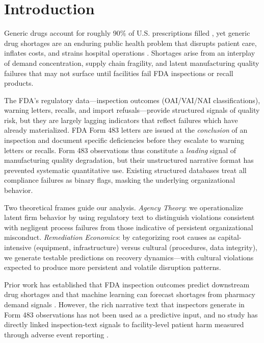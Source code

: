 \documentclass[12pt]{article}
\begin{document}
\newpage

\section{Introduction}
\label{sec:intro}

Generic drugs account for roughly 90\% of U.S. prescriptions filled
\citep{fda2023generic}, yet generic drug shortages are an enduring public
health problem that disrupts patient care, inflates costs, and strains
hospital operations \citep{fox2014shortage}.
Shortages arise from an interplay of demand concentration, supply chain
fragility, and latent manufacturing quality failures that may not surface
until facilities fail FDA inspections or recall products.

The FDA's regulatory data—inspection outcomes (OAI/VAI/NAI classifications),
warning letters, recalls, and import refusals—provide structured signals of
quality risk, but they are largely lagging indicators that reflect failures
which have already materialized.
FDA Form 483 letters are issued at the \emph{conclusion} of an inspection and
document specific deficiencies before they escalate to warning letters or recalls.
Form 483 observations thus constitute a \emph{leading} signal of manufacturing
quality degradation, but their unstructured narrative format has prevented
systematic quantitative use.
Existing structured databases treat all compliance failures as binary flags,
masking the underlying organizational behavior.

Two theoretical frames guide our analysis.
\emph{Agency Theory}: we operationalize latent firm behavior by using regulatory
text to distinguish violations consistent with negligent process failures from
those indicative of persistent organizational misconduct.
\emph{Remediation Economics}: by categorizing root causes as capital-intensive
(equipment, infrastructure) versus cultural (procedures, data integrity), we
generate testable predictions on recovery dynamics---with cultural violations
expected to produce more persistent and volatile disruption patterns.

Prior work has established that FDA inspection outcomes predict downstream drug
shortages \citep{Stomberg2018, Wang2025MSOM} and that machine learning can
forecast shortages from pharmacy demand signals \citep{Liu2021, Pall2023}.
However, the rich narrative text that inspectors generate in Form 483
observations has not been used as a predictive input, and no study has directly
linked inspection-text signals to facility-level patient harm measured through
adverse event reporting \citep{Pazhayattil2020}.
\end{document}
